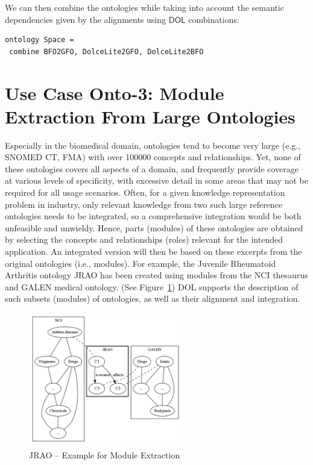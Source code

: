 \documentclass[10pt,fleqn,%
\ifpretendfinal
final%
\else
draft%
\fi,
]{scrreprt}
\newcommand*{\DOL}{\ensuremath{\mathsf{DOL}}\xspace}
\newcommand{\figurerefname}{Figure}
\newcommand{\fref}[1]{\figurerefname~\ref{#1}}
\begin{document}
We can then combine the ontologies while taking into account the semantic dependencies given by the alignments using
\DOL combinations:

\begin{lstlisting}[basicstyle=\ttfamily\footnotesize,language=dolText,morekeywords={props,ObjectProperty,Class,DisjointUnionOf,SubClassOf,Characteristics,Transitive,Asymmetric,SubPropertyOf,DisjointClasses,EquivalentTo,inverse,only,forall,iff,if,or,exists,distributed,from},escapechar=@,mathescape]
ontology Space =
 combine BFO2GFO, DolceLite2GFO, DolceLite2BFO
\end{lstlisting} 

\section{Use Case Onto-3: Module Extraction From Large Ontologies}\label{onto-3}
Especially in the biomedical domain, ontologies tend to become very large (e.g., SNOMED CT, FMA) 
with over 100000 concepts and relationships. Yet, none of these ontologies covers all aspects of a 
domain, and frequently provide coverage at various levels of specificity, with excessive detail in 
some areas that may not be required for all usage scenarios. Often, for a given knowledge 
representation problem in industry, only relevant knowledge from two such large reference 
ontologies needs to be integrated, so a comprehensive integration would be both unfeasible and 
unwieldy. Hence, parts (modules) of these ontologies are obtained by selecting the concepts and 
relationships (roles) relevant for the intended application. An integrated version will then be 
based on these excerpts from the original ontologies (i.e., modules). For example, the Juvenile 
Rheumatoid Arthritis ontology JRAO has been created using modules from the NCI thesaurus and GALEN 
medical ontology. (See \fref{JRAO}) DOL  
supports the description of such subsets (modules) of ontologies, as well as their alignment and 
integration.


\begin{figure}[htbp]
\begin{center}
\includegraphics[width=0.6\textwidth]{useCaseOnto3.png}
\caption{JRAO  -- Example for Module Extraction}
\label{JRAO}
\end{center}
\end{figure}
\end{document}

